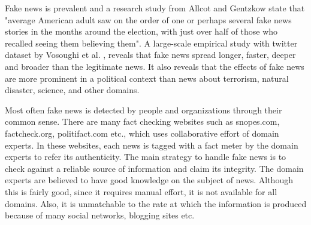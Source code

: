 \documentclass[a4paper, 11pt]{article}
\begin{document}
Fake news is prevalent and a research study from Allcot and Gentzkow \cite{Allcott2017} state that "average American adult saw on the order of one or perhaps several fake news stories in the months around the election, with just over half of those who recalled seeing them believing them". A large-scale empirical study with twitter dataset by Vosoughi et al. \cite{Vosoughi1146}, reveals that fake news spread longer, faster, deeper and broader than the legitimate news. It also reveals that the effects of fake news are more prominent in a political context than news about terrorism, natural disaster, science, and other domains.

Most often fake news is detected by people and organizations through their common sense. There are many fact checking websites such as snopes.com, factcheck.org, politifact.com etc., which uses collaborative effort of domain experts. In these websites, each news is tagged with a fact meter by the domain experts to refer its authenticity. The main strategy to handle fake news is to check against a reliable source of information and claim its integrity. The domain experts are believed to have good knowledge on the subject of news. Although this is fairly good, since it requires manual effort, it is not available for all domains. Also, it is unmatchable to the rate at which the information is produced because of many social networks, blogging sites etc.
\end{document}
